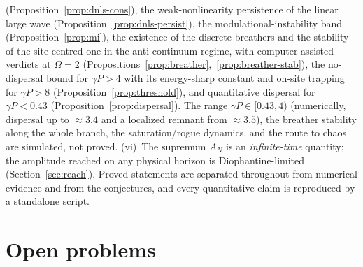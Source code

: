 \documentclass[11pt,reqno]{amsart}
\theoremstyle{plain}
\theoremstyle{definition}
\begin{document}
(Proposition~\ref{prop:dnls-cons}), the weak-nonlinearity persistence of the linear large wave
(Proposition~\ref{prop:dnls-persist}), the modulational-instability band (Proposition~\ref{prop:mi}), the
existence of the discrete breathers and the stability of the site-centred one in the anti-continuum regime,
with computer-assisted verdicts at $\Omega=2$ (Propositions~\ref{prop:breather},~\ref{prop:breather-stab}),
the no-dispersal bound for $\gamma P>4$ with its energy-sharp constant and on-site trapping for $\gamma P>8$
(Proposition~\ref{prop:threshold}), and quantitative dispersal for $\gamma P<0.43$
(Proposition~\ref{prop:dispersal}). The range $\gamma P\in[0.43,4)$ (numerically, dispersal up to $\approx3.4$
and a localized remnant from $\approx3.5$), the breather stability along the whole branch, the
saturation/rogue dynamics, and the route to chaos are simulated, not proved. (vi)~The
supremum $A_N$ is an \emph{infinite-time} quantity; the amplitude reached on any physical horizon is
Diophantine-limited (Section~\ref{sec:reach}). Proved statements are separated throughout from numerical
evidence and from the conjectures, and every quantitative claim is reproduced by a standalone script.

\section{Open problems}
\end{document}
